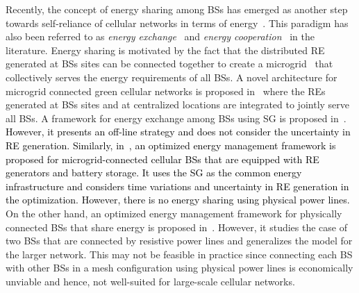 \documentclass[10pt, letter,twocolumn]{IEEEtran}
\begin{document}
Recently, the concept of energy sharing among BSs has emerged as another step towards self-reliance of cellular networks in terms of energy~\cite{energy_exchange1,globecom,sharing3}. This paradigm has also been referred to as \emph{energy exchange}~\cite{energy_exchange1} and \emph{energy cooperation}~\cite{sharing3,sharing1} in the literature. Energy sharing is motivated by the fact that the distributed RE generated at BSs sites can be connected together to create a microgrid~\cite{microgrid_def} that collectively serves the energy requirements of all BSs. A novel architecture for microgrid connected green cellular networks is proposed in~\cite{micro_grid} where the REs generated at BSs sites and at centralized locations are integrated to jointly serve all BSs. %
A framework for energy exchange among BSs using SG is proposed in~\cite{energy_exchange1}. \textcolor{black}{However, it presents an off-line strategy and does not consider the uncertainty in RE generation. Similarly, in~\cite{globecom}, an optimized energy management framework is proposed for microgrid-connected cellular BSs that are equipped with RE generators and battery storage. It uses the SG as the common energy infrastructure and considers time variations and uncertainty in RE generation in the optimization. However, there is no energy sharing using physical power lines.} On the other hand, an optimized energy management framework for physically connected BSs that share energy is proposed in~\cite{sharing3}. However, it studies the case of two BSs that are connected by resistive power lines and generalizes the model for the larger network. This may not be feasible in practice since connecting each BS with other BSs in a mesh configuration using physical power lines is economically unviable and hence, not well-suited for large-scale cellular networks.

\vspace{-0.0cm}
\end{document}
